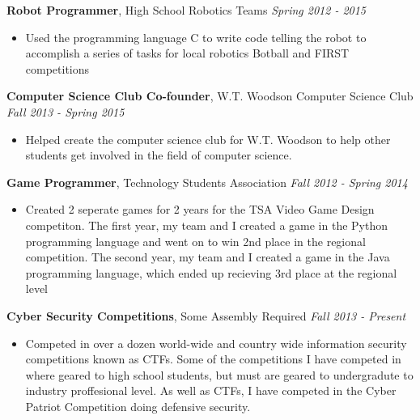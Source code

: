 \documentclass[9pt]{article}
\newenvironment{changemargin}[2]{%
  \begin{list}{}{%
    \setlength{\topsep}{0pt}%
    \setlength{\leftmargin}{#1}%
    \setlength{\rightmargin}{#2}%
    \setlength{\listparindent}{\parindent}%
    \setlength{\itemindent}{\parindent}%
    \setlength{\parsep}{\parskip}%
  }%
  \item[]}{\end{list}
}
\newenvironment{body} {
	\vspace*{-10pt}
	\begin{changemargin}{-0.25in}{-0.5in}
  }	
	{\end{changemargin}
}
\begin{document}
\begin{body}
	\vspace{14pt}
	\textbf{Robot Programmer}, High School Robotics Teams \hfill{} \emph{Spring 2012 - 2015}\\
	\vspace*{-4pt}
	\begin{itemize} \itemsep -0pt
		\item[] Used the programming language C to write code telling the robot to accomplish a series of tasks for local robotics Botball and FIRST competitions 
	\end{itemize}
	\smallskip
	

	\textbf{Computer Science Club Co-founder}, W.T. Woodson Computer Science Club \hfill{} \emph{Fall 2013 - Spring 2015}\\
	\vspace*{-4pt}
	\begin{itemize} \itemsep -0pt
        \item[] Helped create the computer science club for W.T. Woodson to help other students get involved in the field of computer science.
	\end{itemize}
	\smallskip
	
	\textbf{Game Programmer}, Technology Students Association \hfill{} \emph{Fall 2012 - Spring 2014}\\
	\vspace*{-4pt}
	\begin{itemize} \itemsep -0pt
        \item[] Created 2 seperate games for 2 years for the TSA Video Game Design competiton. The first year, my team and I created a game in the Python programming language and went on to win 2nd place in the regional competition. The second year, my team and I created a game in the Java programming language, which ended up recieving 3rd place at the regional level
	\end{itemize}
	\smallskip

	\textbf{Cyber Security Competitions}, Some Assembly Required \hfill{} \emph{Fall 2013 - Present}\\
	\vspace*{-4pt}
	\begin{itemize} \itemsep -0pt
        \item[] Competed in over a dozen world-wide and country wide information security competitions known as CTFs. Some of the competitions I have competed in where geared to high school students, but must are geared to undergradute to industry proffesional level. As well as CTFs, I have competed in the Cyber Patriot Competition doing defensive security.
	\end{itemize}
	\smallskip


\end{body}
\end{document}
